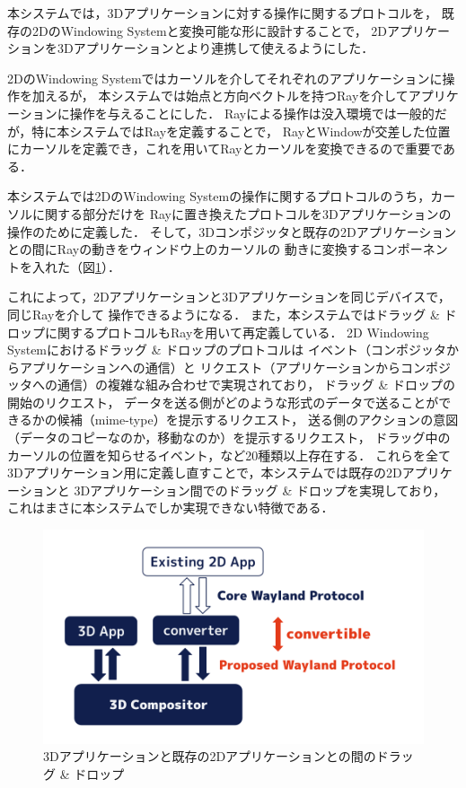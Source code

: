 本システムでは，3Dアプリケーションに対する操作に関するプロトコルを，
既存の2DのWindowing Systemと変換可能な形に設計することで，
2Dアプリケーションを3Dアプリケーションとより連携して使えるようにした．

2DのWindowing Systemではカーソルを介してそれぞれのアプリケーションに操作を加えるが，
本システムでは始点と方向ベクトルを持つRayを介してアプリケーションに操作を与えることにした．
Rayによる操作は没入環境では一般的だが，特に本システムではRayを定義することで，
RayとWindowが交差した位置にカーソルを定義でき，これを用いてRayとカーソルを変換できるので重要である．

本システムでは2DのWindowing Systemの操作に関するプロトコルのうち，カーソルに関する部分だけを
Rayに置き換えたプロトコルを3Dアプリケーションの操作のために定義した．
そして，3Dコンポジッタと既存の2Dアプリケーションとの間にRayの動きをウィンドウ上のカーソルの
動きに変換するコンポーネントを入れた（図\ref{fig:dnd-architecture}）．

これによって，2Dアプリケーションと3Dアプリケーションを同じデバイスで，同じRayを介して
操作できるようになる．
また，本システムではドラッグ \& ドロップに関するプロトコルもRayを用いて再定義している．
2D Windowing Systemにおけるドラッグ \& ドロップのプロトコルは
イベント（コンポジッタからアプリケーションへの通信）と
リクエスト（アプリケーションからコンポジッタへの通信）の複雑な組み合わせで実現されており，
ドラッグ \& ドロップの開始のリクエスト，
データを送る側がどのような形式のデータで送ることができるかの候補（mime-type）を提示するリクエスト，
送る側のアクションの意図（データのコピーなのか，移動なのか）を提示するリクエスト，
ドラッグ中のカーソルの位置を知らせるイベント，など20種類以上存在する．
これらを全て3Dアプリケーション用に定義し直すことで，本システムでは既存の2Dアプリケーションと
3Dアプリケーション間でのドラッグ \& ドロップを実現しており，
これはまさに本システムでしか実現できない特徴である．


\begin{figure}[htbp]
  \centering
  \includegraphics[keepaspectratio, width=0.9\linewidth]{figures/dnd-architecture.png}
  \caption{
    3Dアプリケーションと既存の2Dアプリケーションとの間のドラッグ \& ドロップ
  }
  \label{fig:dnd-architecture}
\end{figure}

